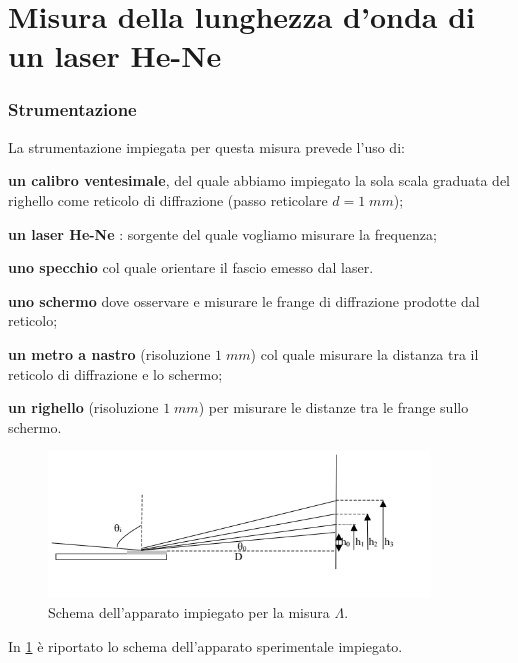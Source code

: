 \part{Misura della lunghezza d'onda di un laser He-Ne } \label{part:Ottica_1A}

\section{Strumentazione}
La strumentazione impiegata per questa misura prevede l'uso di:
\begin{list}{}
\item \textbf{un calibro ventesimale}, del quale abbiamo impiegato la sola scala graduata del righello come reticolo
di diffrazione  (passo reticolare $d = 1 \; mm$);
\item \textbf{un laser He-Ne} : sorgente del quale vogliamo misurare la frequenza;
\item \textbf{uno specchio} col quale orientare il fascio emesso dal laser.
\item \textbf{uno schermo} dove osservare e misurare le frange di diffrazione prodotte dal reticolo;
\item \textbf{un metro a nastro} (risoluzione $1 \; mm$) col quale misurare la distanza tra il reticolo di 
diffrazione e lo schermo;
\item \textbf{un righello} (risoluzione $1 \; mm$) per misurare le distanze tra le frange sullo schermo.
\end{list}
\bigskip


\begin{figure} [!h]
	\centering
	\includegraphics[width=0.9\textwidth]{./pictures/immagine1}
	\caption{Schema dell'apparato impiegato per la misura $\Lambda$.}
	\label{fig:schema_appar}
\end{figure}
In \figurename{ \ref{fig:schema_appar}} è riportato lo schema dell'apparato sperimentale impiegato. 